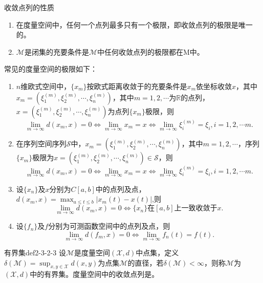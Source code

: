 	\begin{property}\label{property:converge_series}
		收敛点列的性质
		\begin{enumerate}
			\item 在度量空间中，任何一个点列最多只有一个极限，即收敛点列的极限是唯一的。
			\item $\mathcal{M}$是闭集的充要条件是$\mathcal{M}$中任何收敛点列的极限都在M中。
		\end{enumerate}
	\end{property}

	\begin{example}
		常见的度量空间的极限如下：
		\begin{enumerate}
			\item $n$维欧式空间中，$\{x_m\}$按欧式距离收敛于的充要条件是$x_m$依坐标收敛$x$，其中$x_m = (\xi_1^{(m)},\xi_2^{(m)},\cdots,\xi_n^{(m)})$，其中$m=1,2,\cdots$为$\mathbb{R}$的点列，$x = (\xi_1^{(m)},\xi_2^{(m)},\cdots,\xi_n^{(m)})$为点列$\{x_m\}$极限，则
			$$\lim _{m \rightarrow \infty} d\left(x_{m}, x\right)=0 \Leftrightarrow \lim _{m \rightarrow \infty} x_{m}=x \Leftrightarrow \lim _{m \rightarrow \infty} \xi ^{(m)}_i= \xi_i,i=1,2,\cdots m.$$
			\item 在序列空间序列$\mathcal{S}$中，$x_m = (\xi_1^{(m)},\xi_2^{(m)},\cdots,\xi_n^{(m)})$，其中$ m=1,2,\cdots$，序列$\{x_m\}$极限为$x = (\xi_1^{(m)},\xi_2^{(m)},\cdots,\xi_n^{(m)}) \in \mathcal{S} $，则
			$$\lim _{m \rightarrow \infty} d\left(x_{m}, x\right)=0 \Leftrightarrow \lim _{m \rightarrow \infty} x_{m}=x \Leftrightarrow \lim _{m \rightarrow \infty} \xi ^{(m)}_i= \xi_i,i=1,2,\cdots m.$$
			\item 设$\{ x_n\}$及$x$分别为$C[a,b]$中的点列及点，$d(x_m, x)=  \max_{a\le t \le b} |x_m(t)-x(t)|$,则
			$$\lim _{m \rightarrow \infty} d\left(x_{m}, x\right)=0 \Leftrightarrow \{x_n\} \mbox{在} [a,b] \mbox{上一致收敛于} x.$$
			\item 设$\{f_n\}$及$f$分别为可测函数空间中的点列及点，则
			$$\lim _{m \rightarrow \infty} d\left(f_{m}, x\right)=0 \Leftrightarrow \lim _{m \rightarrow \infty} f_n(t)= f(t).$$
		\end{enumerate}
	\end{example}
	
	\begin{definition}{有界集}{def2-3-2-3}
		设$\mathcal{M}$是度量空间$(\mathcal{X},d)$中点集，定义$\delta(\mathcal{M}) = \sup _{x,y \in \mathcal{X}} d(x,y)$为点集$\mathcal{M}$的直径，若$\delta(\mathcal{M}) <\infty$，则称$\mathcal{M}$为$(\mathcal{X},d)$中的有界集。度量空间中的收敛点列是。	
	\end{definition}

